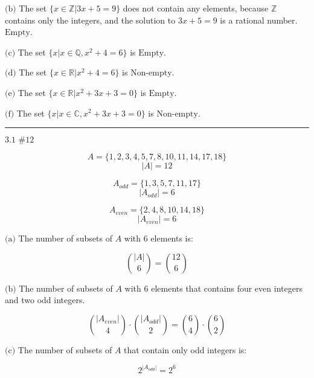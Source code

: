 \documentclass{article}
\newcommand{\problem}[2]{$\boxed{\text{#1 \##2}}$}
\newcommand{\subproblem}[1]{$\boxed{\text{(#1)}}$}
\begin{document}
\begin{multicols*}{2}
%
\subproblem{b} The set $\{x\in\mathbb{Z}|3x+5=9\}$ does not contain
any elements, because $\mathbb{Z}$ contains only the integers, and the
solution to $3x+5=9$ is a rational number. $\boxed{\text{Empty}}$.

%
\subproblem{c} The set $\{x|x\in\mathbb{Q},x^2+4=6\}$ is
$\boxed{\text{Empty}}$.

%
\subproblem{d} The set $\{x\in\mathbb{R}|x^2+4=6\}$ is
$\boxed{\text{Non-empty}}$.

%
\subproblem{e} The set $\{x\in\mathbb{R}|x^2+3x+3=0\}$ is
$\boxed{\text{Empty}}$.

%
\subproblem{f} The set $\{x|x\in\mathbb{C},x^2+3x+3=0\}$ is
$\boxed{\text{Non-empty}}$.

\rule{\linewidth}{0.4pt}

%
\problem{3.1}{12}

\[
A=\{1,2,3,4,5,7,8,10,11,14,17,18\}
\] \[
|A|=12
\]

\[
A_{odd}=\{1,3,5,7,11,17\}
\] \[
|A_{odd}|=6
\]

\[
A_{even}=\{2,4,8,10,14,18\}
\] \[
|A_{even}|=6
\]

%
\subproblem{a} The number of subsets of $A$ with $6$ elements is:

\[
\binom{|A|}{6}=\boxed{\binom{12}{6}}
\]

%
\subproblem{b} The number of subsets of $A$ with $6$ elements that
contains four even integers and two odd integers.

\[
\binom{|A_{even}|}{4}\cdot\binom{|A_{odd}|}{2}=\boxed{\binom{6}{4}\cdot\binom{6}{2}}
\]

%
\subproblem{c} The number of subsets of $A$ that contain only odd integers is:

\[
2^{|A_{odd}|}=\boxed{2^6}
\]



\end{multicols*}
\end{document}
